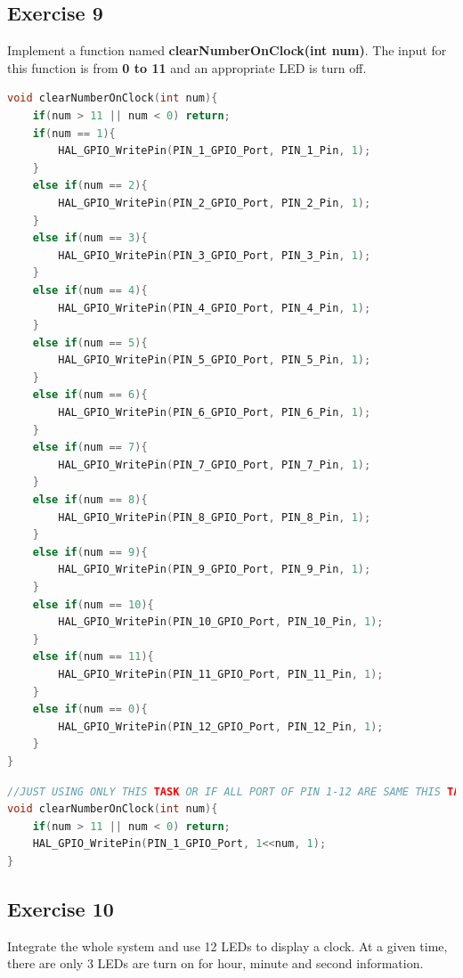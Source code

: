 \documentclass[twoside, final]{hcmut_report}
\begin{document}
\subsection{Exercise 9}
Implement a function named \textbf{clearNumberOnClock(int num)}. The input for this function is from \textbf{0 to 11} and an appropriate LED is turn off.
\begin{lstlisting}[language=C, caption=Source code for the clearNumberOnClock(int num) function]
void clearNumberOnClock(int num){
	if(num > 11 || num < 0) return;
	if(num == 1){
		HAL_GPIO_WritePin(PIN_1_GPIO_Port, PIN_1_Pin, 1);
	}
	else if(num == 2){
		HAL_GPIO_WritePin(PIN_2_GPIO_Port, PIN_2_Pin, 1);
	}
	else if(num == 3){
		HAL_GPIO_WritePin(PIN_3_GPIO_Port, PIN_3_Pin, 1);
	}
	else if(num == 4){
		HAL_GPIO_WritePin(PIN_4_GPIO_Port, PIN_4_Pin, 1);
	}
	else if(num == 5){
		HAL_GPIO_WritePin(PIN_5_GPIO_Port, PIN_5_Pin, 1);
	}
	else if(num == 6){
		HAL_GPIO_WritePin(PIN_6_GPIO_Port, PIN_6_Pin, 1);
	}
	else if(num == 7){
		HAL_GPIO_WritePin(PIN_7_GPIO_Port, PIN_7_Pin, 1);
	}
	else if(num == 8){
		HAL_GPIO_WritePin(PIN_8_GPIO_Port, PIN_8_Pin, 1);
	}
	else if(num == 9){
		HAL_GPIO_WritePin(PIN_9_GPIO_Port, PIN_9_Pin, 1);
	}
	else if(num == 10){
		HAL_GPIO_WritePin(PIN_10_GPIO_Port, PIN_10_Pin, 1);
	}
	else if(num == 11){
		HAL_GPIO_WritePin(PIN_11_GPIO_Port, PIN_11_Pin, 1);
	}
	else if(num == 0){
		HAL_GPIO_WritePin(PIN_12_GPIO_Port, PIN_12_Pin, 1);
	}
}
\end{lstlisting}

\begin{lstlisting}[language=C, caption=Source code for the clearNumberOnClock(int num) function]
//JUST USING ONLY THIS TASK OR IF ALL PORT OF PIN 1-12 ARE SAME THIS TASK.
void clearNumberOnClock(int num){
	if(num > 11 || num < 0) return;
	HAL_GPIO_WritePin(PIN_1_GPIO_Port, 1<<num, 1);
}
\end{lstlisting}
\subsection{Exercise 10}
Integrate the whole system and use 12 LEDs to display a clock. At a given time, there are only 3 LEDs are turn on for hour, minute and second information.
\end{document}
